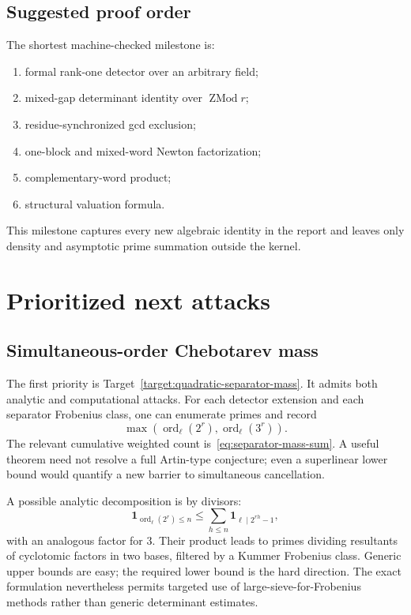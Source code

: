 \documentclass[11pt,oneside]{article}
\theoremstyle{definition}
\theoremstyle{remark}
\newcommand{\ord}{\operatorname{ord}}
\begin{document}
\subsection{Suggested proof order}

The shortest machine-checked milestone is:
\begin{enumerate}
\item formal rank-one detector over an arbitrary field;
\item mixed-gap determinant identity over $\operatorname{ZMod}r$;
\item residue-synchronized gcd exclusion;
\item one-block and mixed-word Newton factorization;
\item complementary-word product;
\item structural valuation formula.
\end{enumerate}
This milestone captures every new algebraic identity in the report and leaves only density and
asymptotic prime summation outside the kernel.

\section{Prioritized next attacks}
\label{sec:next}

\subsection{Simultaneous-order Chebotarev mass}

The first priority is Target~\ref{target:quadratic-separator-mass}.  It admits both analytic
and computational attacks.  For each detector extension and each separator Frobenius class,
one can enumerate primes and record
\[
 \max(\ord_\ell(2^r),\ord_\ell(3^r)).
\]
The relevant cumulative weighted count is~\eqref{eq:separator-mass-sum}.  A useful theorem need
not resolve a full Artin-type conjecture; even a superlinear lower bound would quantify a new
barrier to simultaneous cancellation.

A possible analytic decomposition is by divisors:
\begin{equation}
 \mathbf 1_{\ord_\ell(2^r)\le n}
 \le \sum_{h\le n}\mathbf 1_{\ell\mid2^{rh}-1},
 \label{eq:order-divisor-decomp}
\end{equation}
with an analogous factor for $3$.  Their product leads to primes dividing resultants of
cyclotomic factors in two bases, filtered by a Kummer Frobenius class.  Generic upper bounds
are easy; the required lower bound is the hard direction.  The exact formulation nevertheless
permits targeted use of large-sieve-for-Frobenius methods rather than generic determinant
estimates.
\end{document}
